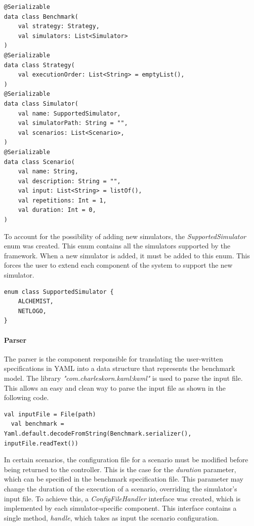 \documentclass[12pt,a4paper,openright,twoside]{book}
\begin{document}
\begin{lstlisting}[style=my-kotlin, language=my-kotlin, caption={Benchmark model.}]
@Serializable
data class Benchmark(
    val strategy: Strategy,
    val simulators: List<Simulator>
)
@Serializable
data class Strategy(
    val executionOrder: List<String> = emptyList(),
)
@Serializable
data class Simulator(
    val name: SupportedSimulator,
    val simulatorPath: String = "",
    val scenarios: List<Scenario>,
)
@Serializable
data class Scenario(
    val name: String,
    val description: String = "",
    val input: List<String> = listOf(),
    val repetitions: Int = 1,
    val duration: Int = 0,
)
\end{lstlisting}

To account for the possibility of adding new simulators, the \emph{SupportedSimulator} enum was created.
This enum contains all the simulators supported by the framework. When a new simulator is added, it must be added to this enum.
This forces the user to extend each component of the system to support the new simulator.

\begin{lstlisting}[style=my-kotlin, language=my-kotlin, caption={SupportedSimulator enum}]
  enum class SupportedSimulator {
    ALCHEMIST,
    NETLOGO,
}
\end{lstlisting}

\paragraph*{Parser}
The parser is the component responsible for translating the user-written specifications in YAML into a data structure that represents the benchmark model.
The library \emph{"com.charleskorn.kaml:kaml"} is used to parse the input file.
This allows an easy and clean way to parse the input file as shown in the following code.

\begin{lstlisting}[style=my-kotlin, language=my-kotlin, caption={Parsing of the input file}]
  val inputFile = File(path)
  val benchmark = Yaml.default.decodeFromString(Benchmark.serializer(), inputFile.readText())
\end{lstlisting}

In certain scenarios, the configuration file for a scenario must be modified before being returned to the controller.
This is the case for the \emph{duration} parameter, which can be specified in the benchmark specification file.
This parameter may change the duration of the execution of a scenario, overriding the simulator's input file. 
To achieve this, a \emph{ConfigFileHandler} interface was created, which is implemented by each simulator-specific component.
This interface contains a single method, \emph{handle}, which takes as input the scenario configuration.
\end{document}
